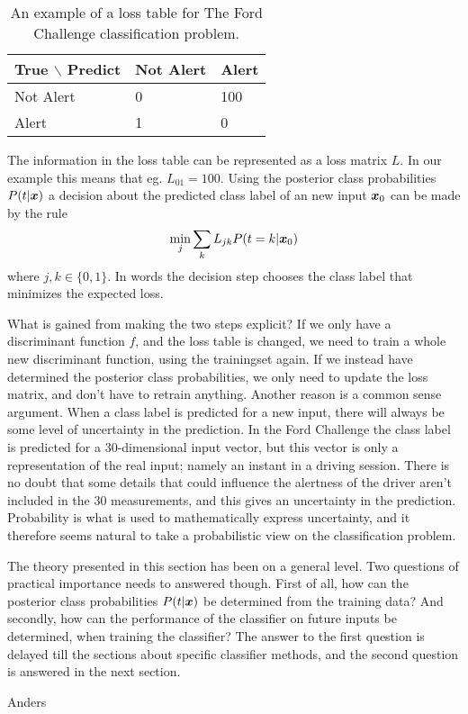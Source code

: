     \begin{table}
        \centering
        {\small\sffamily
        \begin{tabularx}{6cm}{ l | X X }
            {\footnotesize True $\backslash$ Predict} & Not Alert & Alert \\\hline
            Not Alert & 0 & 100 \\
            Alert & 1 & 0
        \end{tabularx}
        }
        \caption{An example of a loss table for The Ford Challenge classification problem.}
        \label{tbl:loss-table}
    \end{table}
    The information in the loss table can be represented as a loss matrix $L$. In our example this means that eg. $L_{01}=100$. Using the posterior class probabilities $P(t|\boldsymbol{x})$ a decision about the predicted class label of an new input $\boldsymbol{x}_0$ can be made by the rule
    \[
        \min_j \sum_{k} L_{jk}P(t=k|\boldsymbol{x}_0)
    \]
    where $j,k\in\{0,1\}$. In words the decision step chooses the class label that minimizes the expected loss. \par
    What is gained from making the two steps explicit? If we only have a discriminant function $f$, and the loss table is changed, we need to train a whole new discriminant function, using the trainingset again. If we instead have determined the posterior class probabilities, we only need to update the loss matrix, and don't have to retrain anything. Another reason is a common sense argument. When a class label is predicted for a new input, there will always be some level of uncertainty in the prediction. In the Ford Challenge the class label is predicted for a 30-dimensional input vector, but this vector is only a representation of the real input; namely an instant in a driving session. There is no doubt that some details that could influence the alertness of the driver aren't included in the 30 measurements, and this gives an uncertainty in the prediction. Probability is what is used to mathematically express uncertainty, and it therefore seems natural to take a probabilistic view on the classification problem. \par
    The theory presented in this section has been on a general level. Two questions of practical importance needs to answered though. First of all, how can the posterior class probabilities $P(t|\boldsymbol{x})$ be determined from the training data? And secondly, how can the performance of the classifier on future inputs be determined, when training the classifier? The answer to the first question is delayed till the sections about specific classifier methods, and the second question is answered in the next section.
    \begin{definition}
        Anders
    \end{definition}


